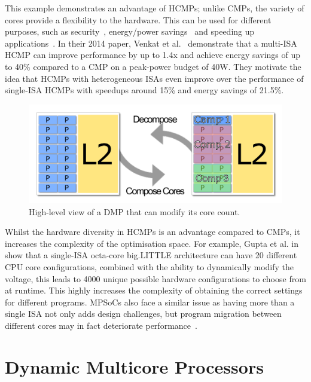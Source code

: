 This example demonstrates an advantage of HCMPs; unlike CMPs, the variety of cores provide a flexibility to the hardware.
This can be used for different purposes, such as security~\cite{venkatHipstr2016}, energy/power savings~\cite{venkat2014harnessingisa} and speeding up applications~\cite{venkat2014harnessingisa}.
In their 2014 paper, Venkat et al.~\cite{venkat2014harnessingisa} demonstrate that a multi-ISA HCMP can improve performance by up to 1.4x and achieve energy savings of up to 40\% compared to a CMP on a peak-power budget of 40W.
They motivate the idea that HCMPs with heterogeneous ISAs even improve over the performance of single-ISA HCMPs with speedups around 15\% and energy savings of 21.5\%.

\begin{figure}[t]
    \centering
    \includegraphics[width=1\textwidth]{background/graphics/cmp_new.pdf}
    \caption{High-level view of a DMP that can modify its core count.}
    \label{fig:dynmulticore}
	\vspace{-0.5em}
\end{figure}
Whilst the hardware diversity in HCMPs is an advantage compared to CMPs, it increases the complexity of the optimisation space.
For example, Gupta et al. in ~\cite{Gupta2017Dypo} show that a single-ISA octa-core big.LITTLE architecture can have 20 different CPU core configurations, combined with the ability to dynamically modify the voltage, this leads to 4000 unique possible hardware configurations to choose from at runtime.
This highly increases the complexity of obtaining the correct settings for different programs.
MPSoCs also face a similar issue as having more than a single ISA not only adds design challenges, but program migration between different cores may in fact deteriorate performance~\cite{DeVuystMigration2012}.
\vspace{-1em}
\section{Dynamic Multicore Processors}~\label{sec:dmp}
\vspace{-1em}


